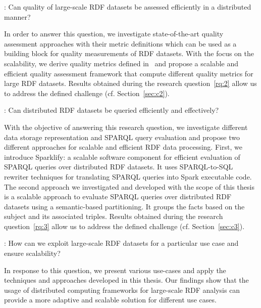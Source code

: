 \begin{tcolorbox}
\textbf{\rqNr[RQ2]\label{rq:2}}: Can quality of large-scale \gls{RDF} datasets be assessed efficiently in a distributed manner?
\end{tcolorbox}

In order to answer this question, we investigate state-of-the-art quality assessment approaches with their metric definitions which can be used as a building block for quality measurements of \gls{RDF} datasets.
With the focus on the scalability, we derive quality metrics defined in~\cite{zaveri2015quality} and propose a scalable and efficient quality assessment framework that compute different quality metrics for large \gls{RDF} datasets.
Results obtained during the research question~\ref{rq:2} allow us to address the defined challenge (cf. Section~\ref{sec:c2}).

\begin{tcolorbox}
\textbf{\rqNr[RQ3]\label{rq:3}}: Can distributed \gls{RDF} datasets be queried efficiently and effectively?
\end{tcolorbox}

With the objective of answering this research question, we investigate different data storage representation and \gls{SPARQL} query evaluation and propose two different approaches for scalable and efficient \gls{RDF} data processing.
First, we introduce Sparklify: a scalable software component for efficient evaluation of \gls{SPARQL} queries over distributed \gls{RDF} datasets.
It uses SPARQL-to-SQL rewriter techniques for translating \gls{SPARQL} queries into Spark executable code.
The second approach we investigated and developed with the scope of this thesis is a scalable approach to evaluate \gls{SPARQL} queries over distributed \gls{RDF} datasets using a semantic-based partitioning.
It groups the facts based on the subject and its associated triples.
Results obtained during the research question~\ref{rq:3} allow us to address the defined challenge (cf. Section~\ref{sec:c3}). 

\begin{tcolorbox}
\textbf{\rqNr[RQ4]\label{rq:4}}: How can we exploit large-scale \gls{RDF} datasets for a particular use case and ensure scalability?
\end{tcolorbox}

In response to this question, we present various use-cases and apply the techniques and approaches developed in this thesis.
Our findings show that the usage of distributed computing frameworks for large-scale \gls{RDF} analysis can provide a more adaptive and scalable solution for different use cases.

